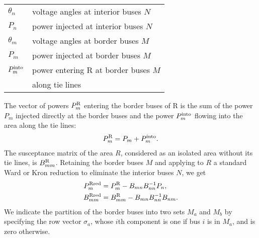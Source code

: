 \documentclass[conference]{IEEEtran}
\begin{document}
	\vspace{5pt}
\noindent
  \begin{tabular}{ @{\hspace{1.5cm}}ll @{}}
  $\theta_n$&voltage angles at interior buses $N$\\
 $P_n$&power injected at interior buses $N$\\
 $\theta_m$&voltage angles at border buses $M$\\
  $P_m$& power injected at border buses $M$\\
$P_{m}^{\rm into}$&power entering R at border buses $M$\\&\qquad along tie lines\\
\end{tabular}
   \vspace{5pt}

The vector of powers $P_m^{\rm R}$ entering the border buses of R is the sum of the 
 power $P_m$ injected directly at the border buses and the power $P_m^{\rm into}$ flowing into the area along the tie lines:
\begin{align}
P_m^{\rm R}=P_m+P_m^{\rm into}.
\label{ImR}
\end{align}
The susceptance matrix of the area $R$, considered as an isolated area without its tie lines, is $B_{mm}^{\rm R}$.
Retaining the border buses $M$ and applying to $R$ a standard Ward or Kron reduction to eliminate the interior buses $N$, we get
\begin{align}
P_m^ {\rm Rred}&=P^{\rm R}_m- B_{{m}n}B_{nn}^{-1}P_{n},
\label{pmred}\\
B_{mm}^ {\rm Rred}&=
B_{mm}^{\rm R}-B_{mn}B_{nn}^{-1}
B_{nm}.
\label{bmmred}
\end{align}
We indicate the partition of the border buses into two sets $M_a$ and $M_b$ by specifying the row vector $\sigma_a$,
whose $i$th component is one if bus $i$ is in $M_a$, and is zero otherwise.
\end{document}
